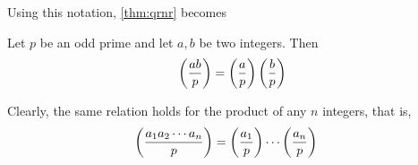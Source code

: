 Using this notation, \autoref{thm:qrnr} becomes
\begin{theorem}\label{thm:qrproduct}
	Let $p$ be an odd prime and let $a,b$ be two integers. Then
	\begin{align*}
		\left(\dfrac{ab}{p}\right) = \left(\dfrac{a}{p}\right) \left(\dfrac{b}{p}\right)
	\end{align*}
\end{theorem}

\begin{remark}
	Clearly, the same relation holds for the product of any $n$ integers, that is,
	\begin{align*}
		\left(\dfrac{a_1a_2\cdots a_n}{p}\right)
			& = \left(\dfrac{a_1}{p}\right) \cdots \left(\dfrac{a_n}{p}\right)
	\end{align*}
\end{remark}

